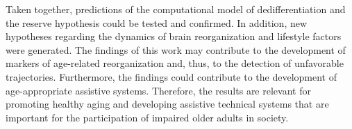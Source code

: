 Taken together, predictions of the computational model of dedifferentiation and the reserve hypothesis could be tested and confirmed. In addition, new hypotheses regarding the dynamics of brain reorganization and lifestyle factors were generated. The findings of this work may contribute to the development of markers of age-related reorganization and, thus, to the detection of unfavorable trajectories. Furthermore, the findings could contribute to the development of age-appropriate assistive systems. Therefore, the results are relevant for promoting healthy aging and developing assistive technical systems that are important for the participation of impaired older adults in society. 




